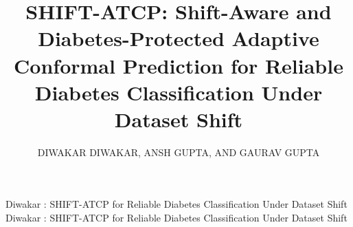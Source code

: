 \documentclass{ieeeaccess}
\begin{document}

\title{SHIFT-ATCP: Shift-Aware and Diabetes-Protected Adaptive Conformal Prediction for Reliable Diabetes Classification Under Dataset Shift}
\author{\uppercase{Diwakar Diwakar}, \uppercase{Ansh Gupta}, AND
\uppercase{Gaurav Gupta}}

\address[1]{SRM University-AP (e-mail: diwakar.p@srmap.edu.in)}
\address[2,3]{Wenzhou University / Wenzhou Medical University / Wenzhou-Kean University (e-mail: ggupta@kean.edu)}


\markboth
{Diwakar \headeretal: SHIFT-ATCP for Reliable Diabetes Classification Under Dataset Shift}
{Diwakar \headeretal: SHIFT-ATCP for Reliable Diabetes Classification Under Dataset Shift}

\end{document}
